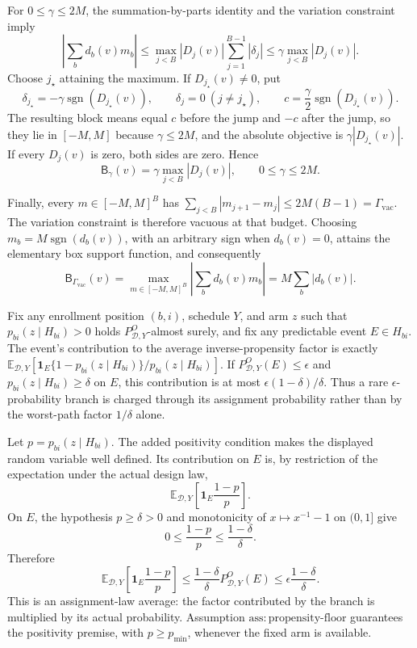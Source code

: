 For \(0\le\gamma\le2M\), the summation-by-parts identity and the variation constraint imply
\[
\left|\sum_bd_b(v)m_b\right|
\le \max_{j<B}|D_j(v)|\sum_{j=1}^{B-1}|\delta_j|
\le\gamma\max_{j<B}|D_j(v)|.
\]
Choose \(j_\star\) attaining the maximum.  If \(D_{j_\star}(v)\ne0\), put
\[
\delta_{j_\star}=-\gamma\operatorname{sgn}(D_{j_\star}(v)),
\qquad \delta_j=0\ (j\ne j_\star),
\qquad c=\frac{\gamma}{2}\operatorname{sgn}(D_{j_\star}(v)).
\]
The resulting block means equal \(c\) before the jump and \(-c\) after the jump, so they lie in \([-M,M]\) because \(\gamma\le2M\), and the absolute objective is
\(\gamma|D_{j_\star}(v)|\).  If every \(D_j(v)\) is zero, both sides are zero.  Hence
\[
\mathsf B_\gamma(v)=\gamma\max_{j<B}|D_j(v)|,
\qquad 0\le\gamma\le2M.
\]

Finally, every \(m\in[-M,M]^B\) has
\(\sum_{j<B}|m_{j+1}-m_j|\le2M(B-1)=\Gamma_{\mathrm{vac}}\).  The variation constraint is therefore vacuous at that budget.  Choosing \(m_b=M\operatorname{sgn}(d_b(v))\), with an arbitrary sign when \(d_b(v)=0\), attains the elementary box support function, and consequently
\[
\mathsf B_{\Gamma_{\mathrm{vac}}}(v)
=\max_{m\in[-M,M]^B}\left|\sum_bd_b(v)m_b\right|
=M\sum_b|d_b(v)|.
\]

Fix any enrollment position \((b,i)\), schedule \(Y\), and arm \(z\) such that \(p_{bi}(z\mid H_{bi})>0\) holds \(P^O_{\mathcal D,Y}\)-almost surely, and fix any predictable event \(E\in H_{bi}\).  The event's contribution to the average inverse-propensity factor is exactly 
\(\mathbb E_{\mathcal D,Y}[\mathbf 1_E\{1-p_{bi}(z\mid H_{bi})\}/p_{bi}(z\mid H_{bi})]\).  If \(P^O_{\mathcal D,Y}(E)\le\epsilon\) and \(p_{bi}(z\mid H_{bi})\ge\delta\) on \(E\), this contribution is at most \(\epsilon(1-\delta)/\delta\).  Thus a rare \(\epsilon\)-probability branch is charged through its assignment probability rather than by the worst-path factor \(1/\delta\) alone.

Let \(p=p_{bi}(z\mid H_{bi})\).  The added positivity condition makes the displayed random variable well defined.  Its contribution on \(E\) is, by restriction of the expectation under the actual design law,
\[
\mathbb E_{\mathcal D,Y}\left[\mathbf 1_E\frac{1-p}{p}\right].
\]
On \(E\), the hypothesis \(p\ge\delta>0\) and monotonicity of \(x\mapsto x^{-1}-1\) on \((0,1]\) give
\[
0\le\frac{1-p}{p}\le\frac{1-\delta}{\delta}.
\]
Therefore
\[
\mathbb E_{\mathcal D,Y}\left[\mathbf 1_E\frac{1-p}{p}\right]
\le \frac{1-\delta}{\delta}P^O_{\mathcal D,Y}(E)
\le\epsilon\frac{1-\delta}{\delta}.
\]
This is an assignment-law average: the factor contributed by the branch is multiplied by its actual probability.  Assumption \(\mathrm{ass:propensity\text{-}floor}\) guarantees the positivity premise, with \(p\ge p_{\min}\), whenever the fixed arm is available.

